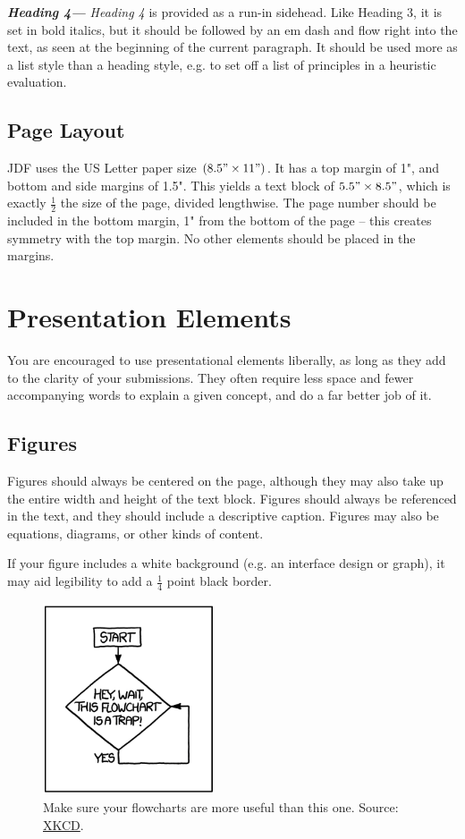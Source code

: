 \documentclass[11pt,a4paper,usenames,dvipsnames]{article}
\begin{document}
\textbf{\textit{Heading 4—}} \textit{Heading 4} is provided as a run-in sidehead. Like Heading 3, it is set in bold italics, but it should be followed by an em dash and flow right into the text, as seen at the beginning of the current paragraph. It should be used more as a list style than a heading style, e.g. to set off a list of principles in a heuristic evaluation.

\subsection{Page Layout}
JDF uses the US Letter paper size $(8.5" \times 11")$. It has a top margin of 1", and bottom and side margins of 1.5". This yields a text block of $5.5" \times 8.5"$, which is exactly $\frac{1}{2}$ the size of the page, divided lengthwise.
The page number should be included in the bottom margin, 1" from the bottom of the page – this creates symmetry with the top margin. No other elements should be placed in the margins.

\section{Presentation Elements}
You are encouraged to use presentational elements liberally, as long as they add to the clarity of your submissions. They often require less space and fewer accompanying words to explain a given concept, and do a far better job of it.

\subsection{Figures}
Figures should always be centered on the page, although they may also take up the entire width and height of the text block. Figures should always be referenced in the text, and they should include a descriptive caption. Figures may also be equations, diagrams, or other kinds of content.

If your figure includes a white background (e.g. an interface design or graph), it may aid legibility to add a $\frac{1}{4}$ point black border.
\begin{figure}[H]
\centering
\includegraphics[width=0.45\textwidth]{xkcd.png}
\caption{\label{fig:xkcd} Make sure your flowcharts are more useful than this one. Source: \href{https://xkcd.com/1195/}{XKCD}.}
\end{figure}
\end{document}
